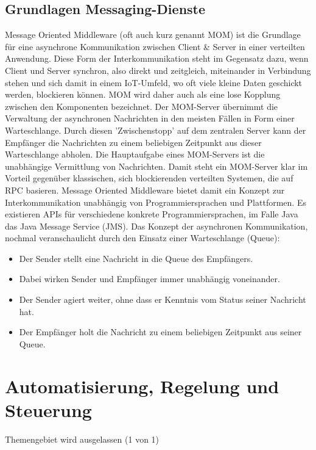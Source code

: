 \documentclass[letterpaper, 12pt]{article}
\let\tempsection\section
\renewcommand\section[1]{\vspace{-0.3cm}\tempsection{#1}\vspace{-0.3cm}}
\let\tempsubsection\subsection
\renewcommand\subsection[1]{\vspace{0cm}\tempsubsection{#1}\vspace{0cm}}
\begin{document}
\subsection{Grundlagen Messaging-Dienste}

Message Oriented Middleware (oft auch kurz genannt MOM) ist die Grundlage für eine asynchrone Kommunikation zwischen Client \& Server in einer verteilten Anwendung. Diese Form der Interkommunikation steht im Gegensatz dazu, wenn Client und Server synchron, also direkt und zeitgleich, miteinander in Verbindung stehen und sich damit in einem IoT-Umfeld, wo oft viele kleine Daten geschickt werden, blockieren können. MOM wird daher auch als eine lose Kopplung zwischen den Komponenten bezeichnet. Der MOM-Server übernimmt die Verwaltung der asynchronen Nachrichten in den meisten Fällen in Form einer Warteschlange. Durch diesen 'Zwischenstopp' auf dem zentralen Server kann der Empfänger die Nachrichten zu einem beliebigen Zeitpunkt aus dieser Warteschlange abholen. Die Hauptaufgabe eines MOM-Servers ist die unabhängige Vermittlung von Nachrichten. Damit steht ein MOM-Server klar im Vorteil gegenüber klassischen, sich blockierenden verteilten Systemen, die auf RPC basieren. Message Oriented Middleware bietet damit ein Konzept zur Interkommunikation unabhängig von Programmiersprachen und Plattformen. Es existieren APIs für verschiedene konkrete Programmiersprachen, im Falle Java das Java Message Service (JMS). Das Konzept der asynchronen Kommunikation, nochmal veranschaulicht durch den Einsatz einer Warteschlange (Queue):

\begin{itemize}
	\item Der Sender stellt eine Nachricht in die Queue des Empfängers.
	\item Dabei wirken Sender und Empfänger immer unabhängig voneinander.
	\item Der Sender agiert weiter, ohne dass er Kenntnis vom Status seiner Nachricht hat.
	\item Der Empfänger holt die Nachricht zu einem beliebigen Zeitpunkt aus seiner Queue. \cite{mom}
\end{itemize}

\section{Automatisierung, Regelung und Steuerung}

Themengebiet wird ausgelassen (1 von 1)

\clearpage
\end{document}
